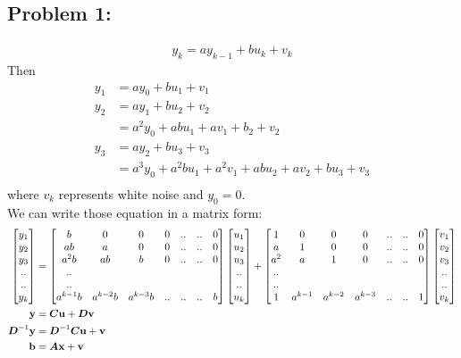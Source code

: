 \documentclass{article}
\begin{document}
 


\subsection*{{Problem 1: }}
\begin{align*} 
y_k=ay_{k-1} + bu_k + v_k
\end{align*}
Then \begin{align*}
y_1 &= ay_0 + bu_1 +v_1 \\
y_2 &= ay_1 + bu_2 +v_2 \\
&= a^2y_0+abu_1+av_1+b_2+v_2 \\
y_3 & = ay_2+ bu_3 + v_3 \\
& = a^3y_0 + a^2bu_1 +a^2v_1 + abu_2 +av_2 +bu_3 +v_3 \\
\end{align*}
where $v_k$ represents white noise and $y_0=0$. \\
We can write those equation in a matrix form: \\
\begin{align*} 
\begin{bmatrix} y_1 \\ y_2 \\ y_3 \\ ..\\ ..\\y_k \end{bmatrix} &= \begin{bmatrix} b& 0& 0& 0& ..& ..& 0 \\ab& a& 0& 0& ..& ..& 0 \\a^2 b& ab& b& 0& ..& ..& 0\\ .. \\ .. \\ a^{k-1}b& a^{k-2}b& a^{k-3}b& ..& ..& ..& b   \end{bmatrix}
	\begin{bmatrix} u_1 \\ u_2 \\ u_3 \\ ..\\ ..\\u_k \end{bmatrix}
	+\begin{bmatrix} 1& 0& 0& 0& ..& ..& 0 \\a& 1& 0& 0& ..& ..& 0 \\a^2& a& 1& 0& ..& ..& 0 \\ .. \\ .. \\ 1& a^{k-1}& a^{k-2} & a^{k-3} & ..& ..& 1  \end{bmatrix}
	\begin{bmatrix} v_1 \\ v_2 \\ v_3 \\ ..\\ ..\\v_k \end{bmatrix}\\
\boldsymbol{\mathrm{y}} &= \boldsymbol{C}\boldsymbol{\mathrm{u}} + \boldsymbol{D}\boldsymbol{\mathrm{v}} \\
\boldsymbol{D}^{-1}\boldsymbol{\mathrm{y}} & = \boldsymbol{D}^{-1}\boldsymbol{C}\boldsymbol{\mathrm{u}} + \boldsymbol{\mathrm{v}} \\
\boldsymbol{\mathrm{b}} &= \boldsymbol{A}\boldsymbol{\mathrm{x}} + \boldsymbol{\mathrm{v}} \\
\end{align*}
\end{document}
